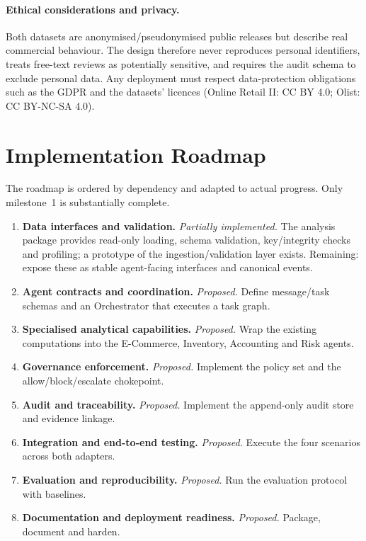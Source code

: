 \documentclass[11pt,a4paper]{article}
\begin{document}
\paragraph{Ethical considerations and privacy.} Both datasets are anonymised/pseudonymised public releases but describe real commercial behaviour. The design therefore never reproduces personal identifiers, treats free-text reviews as potentially sensitive, and requires the audit schema to exclude personal data. Any deployment must respect data-protection obligations such as the GDPR \cite{gdpr2016} and the datasets' licences (Online Retail II: CC BY 4.0; Olist: CC BY-NC-SA 4.0).

\section{Implementation Roadmap}
The roadmap is ordered by dependency and adapted to actual progress. Only milestone~1 is substantially complete.
\begin{enumerate}
\item \textbf{Data interfaces and validation.} \emph{Partially implemented.} The analysis package provides read-only loading, schema validation, key/integrity checks and profiling; a prototype of the ingestion/validation layer exists. Remaining: expose these as stable agent-facing interfaces and canonical events.
\item \textbf{Agent contracts and coordination.} \emph{Proposed.} Define message/task schemas and an Orchestrator that executes a task graph.
\item \textbf{Specialised analytical capabilities.} \emph{Proposed.} Wrap the existing computations into the E-Commerce, Inventory, Accounting and Risk agents.
\item \textbf{Governance enforcement.} \emph{Proposed.} Implement the policy set and the allow/block/escalate chokepoint.
\item \textbf{Audit and traceability.} \emph{Proposed.} Implement the append-only audit store and evidence linkage.
\item \textbf{Integration and end-to-end testing.} \emph{Proposed.} Execute the four scenarios across both adapters.
\item \textbf{Evaluation and reproducibility.} \emph{Proposed.} Run the evaluation protocol with baselines.
\item \textbf{Documentation and deployment readiness.} \emph{Proposed.} Package, document and harden.
\end{enumerate}
\end{document}

